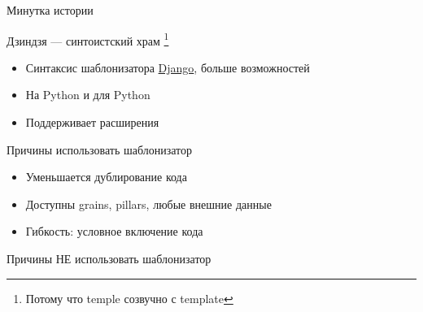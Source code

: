 
\begin{Frame}[c]{Минутка истории}

  \begin{centering}
    \huge
    Дзиндзя — синтоистский храм
    \footnote{Потому что temple созвучно с template}\\
  \end{centering}

  \vfill

  \begin{itemize}[<+-| @alert ->]
    \item Синтаксис шаблонизатора
      \href{https://www.djangoproject.com/}{Django}, больше возможностей
    \item На Python и для Python
    \item Поддерживает расширения
  \end{itemize}
\end{Frame}

\begin{Frame}[t]{Причины использовать шаблонизатор}
  \begin{itemize}[<+-| alert@ +>]
    \item Уменьшается дублирование кода
    \item Доступны grains, pillars, любые внешние данные
    \item Гибкость: условное включение кода
  \end{itemize}
\end{Frame}

\begin{Frame}[c]{Причины НЕ использовать шаблонизатор}
  \centering


\end{Frame}

